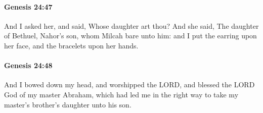 		\paragraph{Genesis 24:47} %
			\label{GENESIS-24-47}

			And I asked her, and said, Whose daughter art thou? And she said, The daughter of Bethuel, Nahor's son, whom Milcah bare unto him: and I put the earring upon her face, and the bracelets upon her hands.


		\paragraph{Genesis 24:48} %
			\label{GENESIS-24-48}

			And I bowed down my head, and worshipped the LORD, and blessed the LORD God of my master Abraham, which had led me in the right way to take my master's brother's daughter unto his son.

